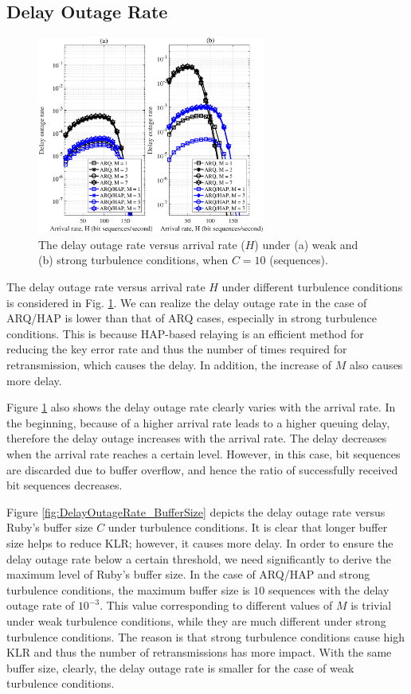 \documentclass[conference]{IEEEtran}
\begin{document}
\subsection{Delay Outage Rate}
\begin{figure}[t]
\begin{center}
\includegraphics[width=7.5cm]{Figures/Figure4.eps}
\end{center}
\caption{The delay outage rate versus arrival rate ($H$) under (a) weak and (b) strong turbulence conditions, when $C=10$ (sequences).}
\label{fig:DelayOutageRate_ArrivalRate}
\end{figure} 

The delay outage rate versus arrival rate $H$ under different turbulence conditions is considered in Fig. \ref{fig:DelayOutageRate_ArrivalRate}. We can realize the delay outage rate in the case of ARQ/HAP is lower than that of ARQ cases, especially in strong turbulence conditions. This is because HAP-based relaying is an efficient method for reducing the key error rate and thus the number of times required for retransmission, which causes the delay. In addition, the increase of $M$ also causes more delay. 

Figure \ref{fig:DelayOutageRate_ArrivalRate} also shows the delay outage rate clearly varies with the arrival rate. In the beginning, because of a higher arrival rate leads to a higher queuing delay, therefore the delay outage increases with the arrival rate. The delay decreases when the arrival rate reaches a certain level. However, in this case, bit sequences are discarded due to buffer overflow, and hence the ratio of successfully received bit sequences decreases.

Figure \ref{fig:DelayOutageRate_BufferSize} depicts the delay outage rate versus Ruby's buffer size $C$ under turbulence conditions. It is clear that longer buffer size helps to reduce KLR; however, it causes more delay. In order to ensure the delay outage rate below a certain threshold, we need significantly to derive the maximum level of Ruby's buffer size. In the case of ARQ/HAP and strong turbulence conditions, the maximum buffer size is $10$ sequences with the delay outage rate of $10^{-3}$. This value corresponding to different values of $M$ is trivial under weak turbulence conditions, while they are much different under strong turbulence conditions. The reason is that strong turbulence conditions cause high KLR and thus the number of retransmissions has more impact. With the same buffer size, clearly, the delay outage rate is smaller for the case of weak turbulence conditions.
\end{document}
